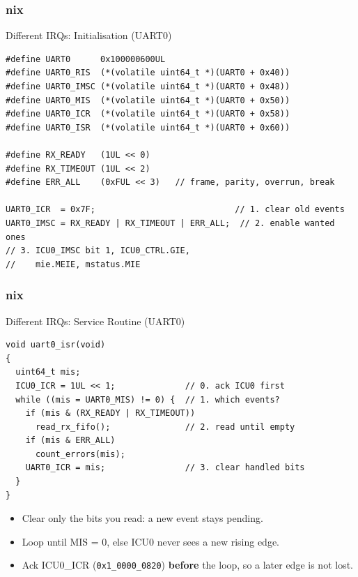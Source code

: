 \documentclass{beamer}
\newcommand{\astitle}{nix}
\newcommand{\assubtitle}{nix}
\newcommand{\cmd}[1]{\texttt{#1}}
\begin{document}
\renewcommand{\assubtitle}{Different IRQs: Initialisation (UART0)}
\begin{frame}[fragile]
\frametitle{\astitle}
\begin{block}{\assubtitle}
\begin{lstlisting}[style=c]
#define UART0      0x100000600UL
#define UART0_RIS  (*(volatile uint64_t *)(UART0 + 0x40))
#define UART0_IMSC (*(volatile uint64_t *)(UART0 + 0x48))
#define UART0_MIS  (*(volatile uint64_t *)(UART0 + 0x50))
#define UART0_ICR  (*(volatile uint64_t *)(UART0 + 0x58))
#define UART0_ISR  (*(volatile uint64_t *)(UART0 + 0x60))

#define RX_READY   (1UL << 0)
#define RX_TIMEOUT (1UL << 2)
#define ERR_ALL    (0xFUL << 3)   // frame, parity, overrun, break

UART0_ICR  = 0x7F;                            // 1. clear old events
UART0_IMSC = RX_READY | RX_TIMEOUT | ERR_ALL;  // 2. enable wanted ones
// 3. ICU0_IMSC bit 1, ICU0_CTRL.GIE,
//    mie.MEIE, mstatus.MIE
\end{lstlisting}
\end{block}
\end{frame}

\renewcommand{\assubtitle}{Different IRQs: Service Routine (UART0)}
\begin{frame}[fragile]
\frametitle{\astitle}
\begin{block}{\assubtitle}
\begin{lstlisting}[style=c]
void uart0_isr(void)
{
  uint64_t mis;
  ICU0_ICR = 1UL << 1;              // 0. ack ICU0 first
  while ((mis = UART0_MIS) != 0) {  // 1. which events?
    if (mis & (RX_READY | RX_TIMEOUT))
      read_rx_fifo();               // 2. read until empty
    if (mis & ERR_ALL)
      count_errors(mis);
    UART0_ICR = mis;                // 3. clear handled bits
  }
}
\end{lstlisting}
\end{block}
  \begin{itemize}
    \item Clear only the bits you read: a new event stays pending.
    \item Loop until MIS = 0, else ICU0 never sees a new rising edge.
    \item Ack ICU0\_ICR (\cmd{0x1\_0000\_0820}) \textbf{before} the loop,
      so a later edge is not lost.
  \end{itemize}
\end{frame}
\end{document}
